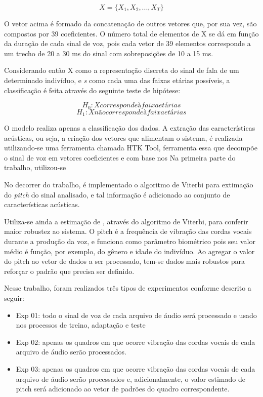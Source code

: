 \[ X = \{X_{1},X_{2},...,X_{T}\} \]

O vetor acima é formado da concatenação de outros vetores que, por sua vez, são compostos por 39 coeficientes.
O número total de elementos de X se dá em função da duração de cada sinal de voz, pois cada vetor de 39 elementos corresponde a um trecho de 20 a 30 ms do sinal com sobreposições de 10 a 15 ms. 

Considerando então X como a representação discreta do sinal de fala de um determinado indivíduo, e \textit{s} como cada uma das faixas etárias possíveis, a classificação é feita através do seguinte teste de hipótese:

\[H_{0} : X corresponde à faixa etária \textit{s}\]
\[H_{1} : X não corresponde à faixa etária \textit{s}\]

O modelo realiza apenas a classificação dos dados. A extração das características acústicas, ou seja, a criação dos vetores que alimentam o sistema, é realizada utilizando-se uma ferramenta chamada HTK Tool, ferramenta essa que decompõe o sinal de voz em vetores coeficientes  e com base nos 
Na primeira parte do trabalho, utilizou-se 

No decorrer do trabalho, é implementado o algoritmo de Viterbi para extimação do \textit{pitch} do sinal analisado, e tal informação é adicionado  ao conjunto de características acústicas. 

Utiliza-se ainda a estimação de , através do algoritmo de Viterbi, para conferir maior robustez ao sistema. O pitch é a frequência de vibração das cordas vocais durante a produção da voz, e funciona como parâmetro biométrico pois seu valor médio é função, por exemplo, do gênero e idade do indivíduo. Ao agregar o valor do pitch ao vetor de dados a ser processado, tem-se dados mais robustos para reforçar o padrão que precisa ser definido.

Nesse trabalho, foram realizados três tipos de experimentos conforme descrito a seguir:

\begin{itemize}
    \item Exp 01: todo o sinal de voz de cada arquivo de áudio será processado e usado nos processos de treino, adaptação e teste
    \item Exp 02: apenas os quadros em que ocorre vibração das cordas vocais de cada arquivo de áudio serão processados.
    \item Exp 03: apenas os quadros em que ocorre vibração das cordas vocais de cada arquivo de áudio serão processados e, adicionalmente, o valor estimado de pitch será adicionado ao vetor de padrões do quadro correspondente.
\end{itemize}

